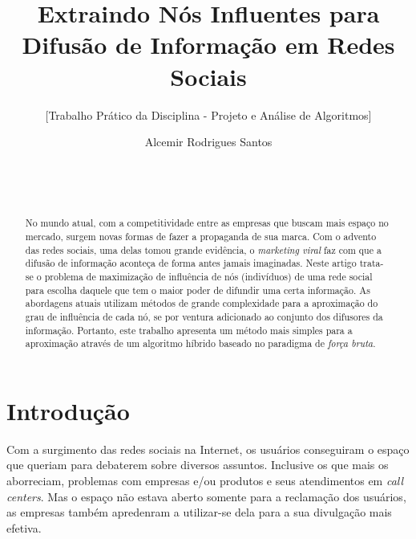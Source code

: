 \documentclass{acm_proc_article-sp}
\title{Extraindo Nós Influentes para Difusão de Informação em Redes Sociais}
\subtitle{[Trabalho Prático da Disciplina - Projeto e Análise de Algoritmos]}
\author{
\alignauthor
  Alcemir Rodrigues Santos \\
  \affaddr{Universidade de Minas Gerais - UFMG}\\
  \affaddr{Instituto de Ciências Exatas - ICEx}\\
  \affaddr{Minas Gerais - Belo Horizonte - Campus Pampulha - CEP 31270-010} \\
  \email{alcemir@dcc.ufmg.br}  
}
\begin{document}
\maketitle
\begin{abstract}
No mundo atual, com a competitividade entre as empresas que buscam mais espaço no mercado, surgem novas formas de
fazer a propaganda de sua marca. Com o advento das redes sociais, uma delas tomou grande evidência, o
\textit{marketing viral} faz com que a difusão de informação aconteça de forma antes jamais imaginadas. 
Neste artigo trata-se o problema de maximização de influência de nós (indivíduos) de uma rede social para escolha
daquele que tem o maior poder de difundir uma certa informação. %
As abordagens atuais utilizam métodos de grande complexidade para a aproximação do grau de influência de cada nó, 
se por ventura adicionado ao conjunto dos difusores da informação.%
Portanto, este trabalho apresenta um método mais simples para a aproximação através de um algoritmo híbrido baseado no paradigma de \textit{força bruta}.

\end{abstract}



\newtheorem{definicao}{Definição}
\section{Introdução}
Com a surgimento das redes sociais na Internet, os usuários conseguiram o espaço que queriam para debaterem sobre diversos assuntos.
Inclusive os que mais os aborreciam, problemas com empresas e/ou produtos e seus atendimentos em \textit{call centers}.
Mas o espaço não estava aberto somente para a reclamação dos usuários, as empresas também apredenram a utilizar-se dela para a sua 
divulgação mais efetiva. 
\end{document}
